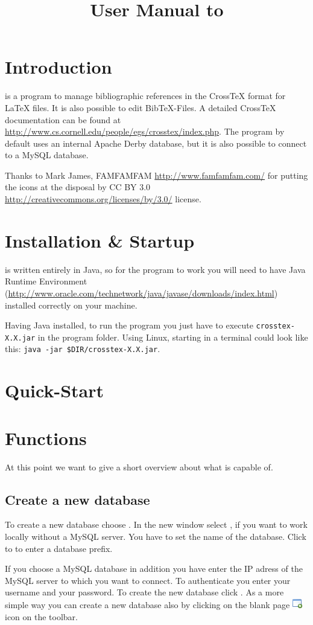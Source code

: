 \documentclass[a4paper,10pt]{scrartcl}
\title{User Manual to \crossrefx}
\author{}
\date{}
\begin{document}
\maketitle
\tableofcontents
\section{Introduction}
\crossrefx is a program to manage bibliographic references in the CrossTeX
format for LaTeX files. It is also possible to edit BibTeX-Files.
A detailed CrossTeX documentation can be found at
\url{http://www.cs.cornell.edu/people/egs/crosstex/index.php}.
The program by default uses an internal Apache Derby database, but it is also
possible to connect to a MySQL database.

Thanks to Mark James, FAMFAMFAM  \url{http://www.famfamfam.com/} for putting the
icons at the disposal by CC BY 3.0
\url{http://creativecommons.org/licenses/by/3.0/} license.
\section{Installation \& Startup}
\crossrefx is written entirely in Java, so for the program to work you will need
to have Java Runtime Environment
(\url{http://www.oracle.com/technetwork/java/javase/downloads/index.html})
installed correctly on your machine.

Having Java installed, to run the program you just have to execute
\texttt{crosstex-X.X.jar} in the program folder. Using Linux, starting in a
terminal could look like this: \texttt{java -jar \$DIR/crosstex-X.X.jar}.
\section{Quick-Start}

\section{Functions}
At this point we want to give a short overview about what \crossrefx is capable
of.
\subsection{Create a new database}
To create a new database choose \clickpath{\file}{\newdatabase}.
In the new window select \internaldatabase, if you want to work locally without
a MySQL server. You have to set the name of the database. Click to \connectdb to
enter a database prefix.

If you choose a MySQL database in addition you have enter the IP adress of the
MySQL server to which you want to connect. To authenticate you enter your
username and your password. To create the new database click \ok. As a more
simple way you can create a new database also by clicking on the blank page
\includegraphics{../../images/application_add.png} icon on the toolbar.
\end{document}
